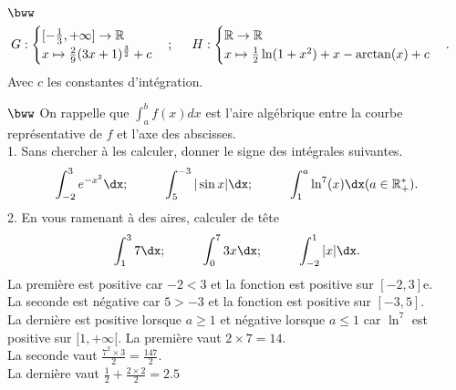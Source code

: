 \documentclass[11pt]{article}
\begin{document}
\begin{exercice}{$\bww$}{}
\begin{align*}
        &G:\begin{cases}[-\frac{1}{3}, +\infty]\rightarrow\mathbb{R}\\x\mapsto\frac{2}{9}(3x+1)^{\frac{3}{2}} + c\end{cases}; \hspace{0.5cm}H:\begin{cases}\mathbb{R}\rightarrow\mathbb{R}\\x\mapsto\frac{1}{2}\ln(1+x^2) + x - \arctan(x) + c\end{cases}.
    \end{align*}
    Avec $c$ les constantes d'intégration.
\end{exercice}

\begin{exercice}{$\bww$}{}
    On rappelle que $\int_a^b{f(x)dx}$ est l'aire algébrique entre la courbe représentative de $f$ et l'axe des abscisses.\\
    1. Sans chercher à les calculer, donner le signe des intégrales suivantes.
    \begin{equation*}
        \int_{-2}^3{e^{-x^2}\dx}; \hspace{1cm} \int_5^{-3}{|\sin x|\dx}; \hspace{1cm} \int_1^a{\ln^7(x)\dx} (a\in\mathbb{R_+^*}).
    \end{equation*}
    2. En vous ramenant à des aires, calculer de tête
    \begin{equation*}
        \int_1^3{7\dx}; \hspace{1cm} \int_0^7{3x\dx}; \hspace{1cm} \int_{-2}^1{|x|\dx}.
    \end{equation*}
    \tcblower
    La première est positive car $-2<3$ et la fonction est positive sur $[-2,3]$e.\\
    La seconde est négative car $5>-3$ et la fonction est positive sur $[-3,5]$.\\
    La dernière est positive lorsque $a\geq1$ et négative lorsque $a\leq1$ car $\ln^7$ est positive sur $[1,+\infty[$.\n
    La première vaut $2\times7=14$.\\
    La seconde vaut $\frac{7^2\times3}{2}=\frac{147}{2}$.\\
    La dernière vaut $\frac{1}{2}+\frac{2\times2}{2}=2.5$
\end{exercice}
\end{document}
